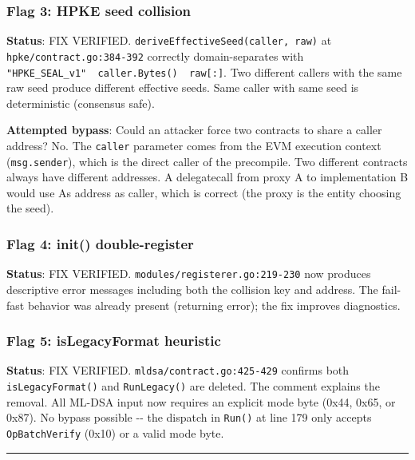 \documentclass[
]{article}
\begin{document}
\subsubsection{Flag 3: HPKE seed
collision}\label{flag-3-hpke-seed-collision}

\textbf{Status}: FIX VERIFIED.
\texttt{deriveEffectiveSeed(caller,\ raw)} at
\texttt{hpke/contract.go:384-392} correctly domain-separates with
\texttt{"HPKE\_SEAL\_v1"\ \textbar{}\textbar{}\ caller.Bytes()\ \textbar{}\textbar{}\ raw{[}:{]}}.
Two different callers with the same raw seed produce different effective
seeds. Same caller with same seed is deterministic (consensus safe).

\textbf{Attempted bypass}: Could an attacker force two contracts to
share a caller address? No. The \texttt{caller} parameter comes from the
EVM execution context (\texttt{msg.sender}), which is the direct caller
of the precompile. Two different contracts always have different
addresses. A delegatecall from proxy A to implementation B would use
A\textquotesingle s address as caller, which is correct (the proxy is
the entity choosing the seed).

\subsubsection{Flag 4: init()
double-register}\label{flag-4-init-double-register}

\textbf{Status}: FIX VERIFIED. \texttt{modules/registerer.go:219-230}
now produces descriptive error messages including both the collision key
and address. The fail-fast behavior was already present (returning
error); the fix improves diagnostics.

\subsubsection{Flag 5: isLegacyFormat
heuristic}\label{flag-5-islegacyformat-heuristic}

\textbf{Status}: FIX VERIFIED. \texttt{mldsa/contract.go:425-429}
confirms both \texttt{isLegacyFormat()} and \texttt{RunLegacy()} are
deleted. The comment explains the removal. All ML-DSA input now requires
an explicit mode byte (0x44, 0x65, or 0x87). No bypass possible -\/- the
dispatch in \texttt{Run()} at line 179 only accepts
\texttt{OpBatchVerify} (0x10) or a valid mode byte.

\begin{center}\rule{0.5\linewidth}{0.5pt}\end{center}
\end{document}
